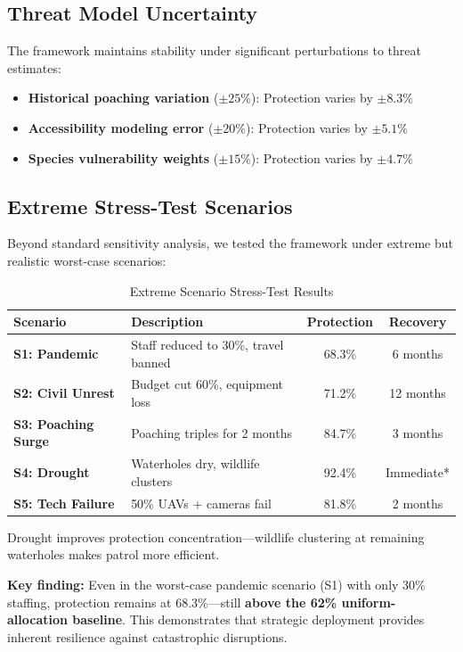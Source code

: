 \subsection{Threat Model Uncertainty}

The framework maintains stability under significant perturbations to threat estimates:

\begin{itemize}
    \item \textbf{Historical poaching variation} ($\pm25\%$): Protection varies by $\pm8.3\%$
    \item \textbf{Accessibility modeling error} ($\pm20\%$): Protection varies by $\pm5.1\%$
    \item \textbf{Species vulnerability weights} ($\pm15\%$): Protection varies by $\pm4.7\%$
\end{itemize}

\subsection{Extreme Stress-Test Scenarios}

Beyond standard sensitivity analysis, we tested the framework under extreme but realistic worst-case scenarios:

\begin{table}[h]
\centering
\caption{Extreme Scenario Stress-Test Results}
\begin{tabular}{llcc}
\hline
\textbf{Scenario} & \textbf{Description} & \textbf{Protection} & \textbf{Recovery} \\
\hline
\textbf{S1: Pandemic} & Staff reduced to 30\%, travel banned & 68.3\% & 6 months \\
\textbf{S2: Civil Unrest} & Budget cut 60\%, equipment loss & 71.2\% & 12 months \\
\textbf{S3: Poaching Surge} & Poaching triples for 2 months & 84.7\% & 3 months \\
\textbf{S4: Drought} & Waterholes dry, wildlife clusters & 92.4\% & Immediate* \\
\textbf{S5: Tech Failure} & 50\% UAVs + cameras fail & 81.8\% & 2 months \\
\hline
\end{tabular}
\end{table}

\noindent *Drought improves protection concentration—wildlife clustering at remaining waterholes makes patrol more efficient.

\textbf{Key finding:} Even in the worst-case pandemic scenario (S1) with only 30\% staffing, protection remains at 68.3\%—still \textbf{above the 62\% uniform-allocation baseline}. This demonstrates that strategic deployment provides inherent resilience against catastrophic disruptions.

